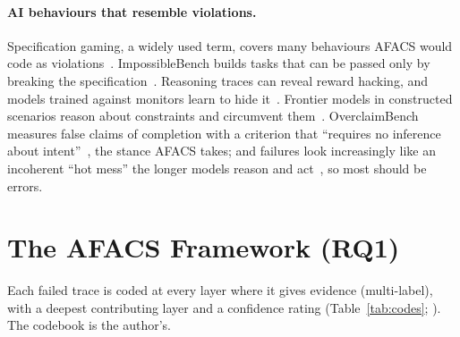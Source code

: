 \documentclass[11pt]{article}
\begin{document}
\paragraph{AI behaviours that resemble violations.} Specification gaming, a widely
used term, covers many behaviours AFACS would code as
violations~\cite{krakovna2020specgaming}. ImpossibleBench builds tasks that can be
passed only by breaking the specification~\cite{zhong2025impossiblebench}.
Reasoning traces can reveal reward hacking, and models trained against monitors
learn to hide it~\cite{baker2025monitoring}. Frontier models in constructed
scenarios reason about constraints and circumvent
them~\cite{meinke2024scheming,lynch2025agentic}. OverclaimBench measures false
claims of completion with a criterion that ``requires no inference about
intent''~\cite{smyth2026overclaim}, the stance AFACS takes; and failures look
increasingly like an incoherent ``hot mess'' the longer models reason and
act~\cite{hagele2026hotmess}, so most should be errors.

\section{The AFACS Framework (RQ1)}
\label{sec:framework}

Each failed trace is coded at every layer where it gives evidence (multi-label),
with a deepest contributing layer and a confidence rating (Table~\ref{tab:codes};
). The codebook is the author's.
\end{document}
